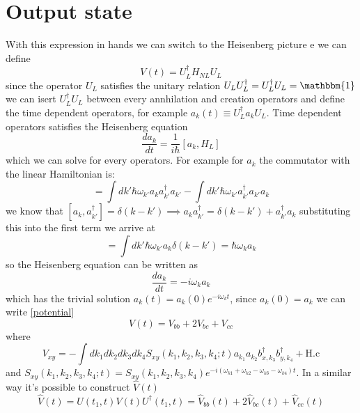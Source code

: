 \section{Output state}
With this expression in hands we can switch to the Heisenberg picture e we can define
\begin{equation}\label{potential}
V(t) = U_L^\dagger H_{NL}U_{L}\end{equation}
since the operator $U_L$ satisfies the unitary relation $U_L U_L^\dagger = U_L^\dagger U_L = \mathbbm{1}$ we can isert $U_L^\dagger U_L$ between every annhilation and creation operators and define the time dependent operators, for example $a_{k}(t) \equiv U_L^\dagger a_{k}U_L$. Time dependent operators satisfies the Heisenberg equation
\begin{equation}\frac{da_{k}}{dt} = \frac{1}{i\hbar}[a_{k},H_L]\end{equation}
which we can solve for every operators. For example for $a_{k}$ the commutator with the linear Hamiltonian is:
\begin{equation}[a_{k},H_L] = \int dk'\hbar \omega_{k'}a_{k} a_{k'}^\dagger a_{k'}-\int dk'\hbar \omega_{k'}a_{k'}^\dagger a_{k'}a_{k}\end{equation}
we know that $[a_k,a_{k'}^\dagger] = \delta(k-k')\implies a_{k} a_{k'}^\dagger = \delta(k-k') + a_{k'}^\dagger a_{k}$ substituting this into the first term we arrive at
\begin{equation}[a_{k},H_L] = \int dk'\hbar \omega_{k'}a_{k}\delta(k-k') = \hbar \omega_{k}a_{k}\end{equation}
so the Heisenberg equation can be written as
\begin{equation}\frac{da_{k}}{dt} = -i\omega_{k}a_{k}\end{equation}
which has the trivial solution $a_k(t) = a_k(0)e^{-i\omega_k t}$, since $a_k(0) = a_k$ we can write \eqref{potential} 
\begin{equation}V(t) = V_{bb} + 2V_{bc} + V_{cc}\end{equation}
where
\begin{equation}V_{xy} = -\int dk_1dk_2dk_3dk_4S_{xy}(k_1,k_2,k_3,k_4;t)a_{k_1}a_{k_2}b_{x,k_3}^\dagger b_{y,k_4}^\dagger +\text{H.c} \end{equation}
and $S_{xy}(k_1,k_2,k_3,k_4;t) = S_{xy}(k_1,k_2,k_3,k_4)e^{-i(\omega_{k1}+\omega_{k2}-\omega_{k3}-\omega_{k4})t}$. In a similar way it's possible to construct $\hat{V}(t)$
\begin{equation}\hat{V}(t) = U(t_1,t)V(t)U^\dagger(t_1,t) = \hat{V}_{bb}(t) + 2\hat{V}_{bc}(t) + \hat{V}_{cc}(t)\end{equation}
